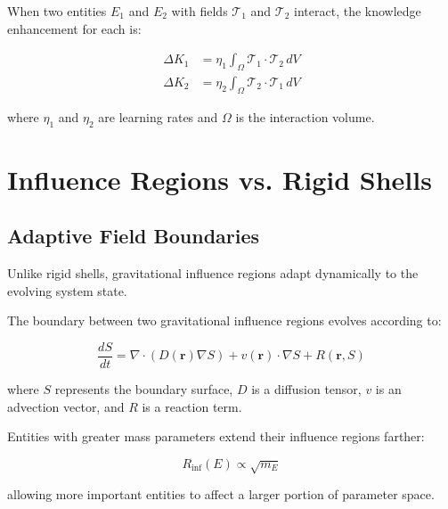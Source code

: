 \begin{theorem}
When two entities $E_1$ and $E_2$ with fields $\mathcal{T}_1$ and $\mathcal{T}_2$ interact, the knowledge enhancement for each is:

\begin{equation}
\begin{aligned}
\Delta K_1 &= \eta_1 \int_{\Omega} \mathcal{T}_1 \cdot \mathcal{T}_2 \, dV \\
\Delta K_2 &= \eta_2 \int_{\Omega} \mathcal{T}_2 \cdot \mathcal{T}_1 \, dV
\end{aligned}
\end{equation}

where $\eta_1$ and $\eta_2$ are learning rates and $\Omega$ is the interaction volume.
\end{theorem}

\section{Influence Regions vs. Rigid Shells}

\subsection{Adaptive Field Boundaries}

Unlike rigid shells, gravitational influence regions adapt dynamically to the evolving system state.

\begin{theorem}
The boundary between two gravitational influence regions evolves according to:

\begin{equation}
\frac{dS}{dt} = \nabla \cdot \left(D(\mathbf{r}) \nabla S\right) + v(\mathbf{r}) \cdot \nabla S + R(\mathbf{r}, S)
\end{equation}

where $S$ represents the boundary surface, $D$ is a diffusion tensor, $v$ is an advection vector, and $R$ is a reaction term.
\end{theorem}

\begin{corollary}
Entities with greater mass parameters extend their influence regions farther:

\begin{equation}
R_{\text{inf}}(E) \propto \sqrt{m_E}
\end{equation}

allowing more important entities to affect a larger portion of parameter space.
\end{corollary}

